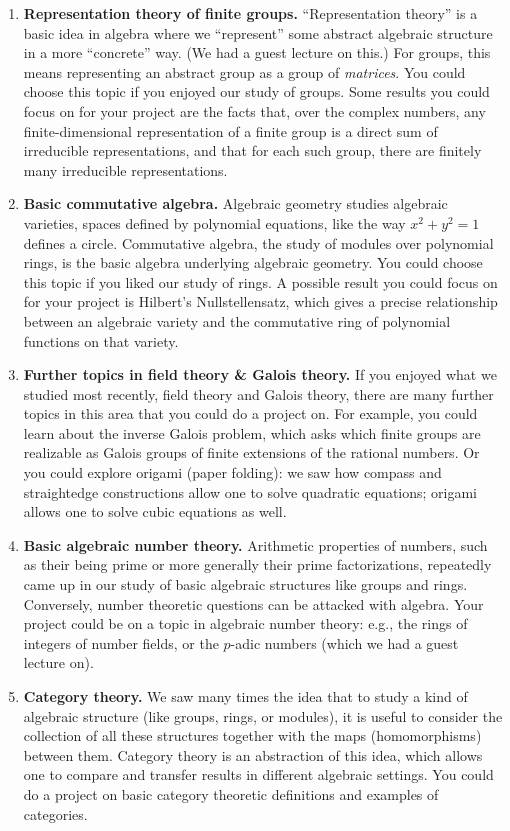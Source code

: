 \documentclass[11pt]{article}
\begin{document}
\begin{enumerate}

\item {\bf Representation theory of finite groups.} ``Representation theory'' is a basic idea in algebra where we ``represent'' some abstract algebraic structure in a more ``concrete'' way. (We had a guest lecture on this.) For groups, this means representing an abstract group as a group of \emph{matrices}. You could choose this topic if you enjoyed our study of groups. Some results you could focus on for your project are the facts that, over the complex numbers, any finite-dimensional representation of a finite group is a direct sum of irreducible representations, and that for each such group, there are finitely many irreducible representations.

\item {\bf Basic commutative algebra.} Algebraic geometry studies algebraic varieties, spaces defined by polynomial equations, like the way $x^2+y^2=1$ defines a circle. Commutative algebra, the study of modules over polynomial rings, is the basic algebra underlying algebraic geometry. You could choose this topic if you liked our study of rings. A possible result you could focus on for your project is Hilbert's Nullstellensatz, which gives a precise relationship between an algebraic variety and the commutative ring of polynomial functions on that variety.

\item {\bf Further topics in field theory \& Galois theory.} If you enjoyed what we studied most recently, field theory and Galois theory, there are many further topics in this area that you could do a project on. For example, you could learn about the inverse Galois problem, which asks which finite groups are realizable as Galois groups of finite extensions of the rational numbers. Or you could explore origami (paper folding): we saw how compass and straightedge constructions allow one to solve quadratic equations; origami allows one to solve cubic equations as well.

\item {\bf Basic algebraic number theory.} Arithmetic properties of numbers, such as their being prime or more generally their prime factorizations, repeatedly came up in our study of basic algebraic structures like groups and rings. Conversely, number theoretic questions can be attacked with algebra. Your project could be on a topic in algebraic number theory: e.g., the rings of integers of number fields, or the $p$-adic numbers (which we had a guest lecture on).

\item {\bf Category theory.} We saw many times the idea that to study a kind of algebraic structure (like groups, rings, or modules), it is useful to consider the collection of all these structures together with the maps (homomorphisms) between them. Category theory is an abstraction of this idea, which allows one to compare and transfer results in different algebraic settings. You could do a project on basic category theoretic definitions and examples of categories.

\end{enumerate}
\end{document}
